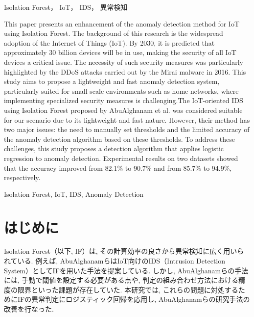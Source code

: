 \documentclass{css}
\begin{document}

\begin{jkeyword}
Isolation Forest， IoT， IDS， 異常検知
\end{jkeyword}

\begin{eabstract}
    This paper presents an enhancement of the anomaly detection method for IoT using Isolation Forest. The background of this research is the widespread adoption of the Internet of Things (IoT). By 2030, it is predicted that approximately 30 billion devices will be in use, making the security of all IoT devices a critical issue. The necessity of such security measures was particularly highlighted by the DDoS attacks carried out by the Mirai malware in 2016. This study aims to propose a lightweight and fast anomaly detection system, particularly suited for small-scale environments such as home networks, where implementing specialized security measures is challenging.The IoT-oriented IDS using Isolation Forest proposed by AbuAlghanam et al. was considered suitable for our scenario due to its lightweight and fast nature. However, their method has two major issues: the need to manually set thresholds and the limited accuracy of the anomaly detection algorithm based on these thresholds. To address these challenges, this study proposes a detection algorithm that applies logistic regression to anomaly detection. Experimental results on two datasets showed that the accuracy improved from 82.1\% to 90.7\% and from 85.7\% to 94.9\%, respectively.
\end{eabstract}


\begin{ekeyword}
Isolation Forest, IoT, IDS, Anomaly Detection
\end{ekeyword}


\maketitle

\section{はじめに}
Isolation Forest（以下, IF）は, その計算効率の良さから異常検知に広く用いられている. 例えば, AbuAlghanamらはIoT向けのIDS（Intrusion Detection System）としてIFを用いた手法を提案している\cite{AbuAlghanam2023-sx}. しかし, AbuAlghanamらの手法には, 手動で閾値を設定する必要がある点や, 判定の組み合わせ方法における精度の限界といった課題が存在していた. 本研究では, これらの問題に対処するためにIFの異常判定にロジスティック回帰を応用し, AbuAlghanamらの研究手法の改善を行なった. 
\end{document}
